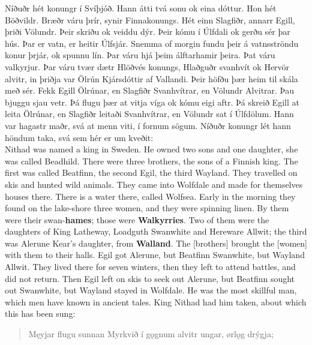 \bookStart

\bva Níðuðr hét konungr í Svíþjóð.
\bva Hann átti tvá sonu ok eina dóttur. Hon hét Böðvildr.
\bva Bræðr váru þrír, synir Finnakonungs.
\bva Hét einn Slagfiðr, annarr Egill, þriði Völundr.
\bva Þeir skriðu ok veiddu dýr. Þeir kómu í Úlfdali ok gerðu sér þar hús.
\bva Þar er vatn, er heitir Úlfsjár.
\bva Snemma of morgin fundu þeir á vatnsströndu konur þrjár, ok spunnu lín.
\bva Þar váru hjá þeim álftarhamir þeira. Þat váru valkyrjur.
\bva Þar váru tvær dætr Hlöðvés konungs, Hlaðguðr svanhvít ok Hervör alvitr, in þriðja var Ölrún Kjársdóttir af Vallandi.
\bva Þeir höfðu þær heim til skála með sér. Fekk Egill Ölrúnar, en Slagfiðr Svanhvítrar, en Völundr Alvitrar.
\bva Þau bjuggu sjau vetr. Þá flugu þær at vitja víga ok kómu eigi aftr.
\bva Þá skreið Egill at leita Ölrúnar, en Slagfiðr leitaði Svanhvítrar, en Völundr sat í Úlfdölum.
\bva Hann var hagastr maðr, svá at menn viti, í fornum sögum.
\bva Níðuðr konungr lét hann höndum taka, svá sem hér er um kveðit: \\%

\bvb Nithad was named a king in Sweden.
\bvb He owned two sons and one daughter, she was called Beadhild.
\bvb There were three brothers, the sons of a Finnish king.
\bvb The first was called Beatfinn, the second Egil, the third Wayland.
\bvb They travelled on skis and hunted wild animals. They came into Wolfdale and made for themselves houses there.
\bvb There is a water there, called Wolfsea.
\bvb Early in the morning they found on the lake-shore three women, and they were spinning linen.
\bvb By them were their swan-\textbf{hames}; those were \textbf{Walkyrries}.
\bvb Two of them were the daughters of King Latheway, Loadguth Swanwhite and Hereware Allwit; the third was Alerune Kear's daughter, from \textbf{Walland}.
\bvb The [brothers] brought the [women] with them to their halls. Egil got Alerune, but Beatfinn Swanwhite, but Wayland Allwit.
\bvb They lived there for seven winters, then they left to attend battles, and did not return.
\bvb Then Egil left on skis to seek out Alerune, but Beatfinn sought out Swanwhite, but Wayland stayed in Wolfdale.
\bvb He was the most skillful man, which men have known in ancient tales.
\bvb King Nithad had him taken, about which this has been sung: \\

\chapterStart

\begin{verse}
\bva Męyjar flugu sunnan \hld Myrkvið í gǫgnum
alvitr ungar, \hld ørlǫg drýgja; \\%
\end{verse}


